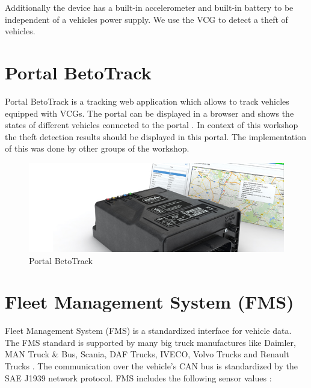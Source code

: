 Additionally the device has a built-in accelerometer and built-in battery to be independent of a vehicles power supply. We use the VCG to detect a theft of vehicles.

\section{Portal BetoTrack}
\label{sec::Portal}

Portal BetoTrack is a tracking web application which allows to track vehicles equipped with VCGs. The portal can be displayed in a browser and shows the states of different vehicles connected to the portal \cite{BetoTrack}.
In context of this workshop the theft detection results should be displayed in this portal. The implementation of this was done by other groups of the workshop.

\begin{figure}[h]
    \includegraphics[width=1.0\textwidth]{src/pic/betotrack_630x220px.jpg}
    \caption{Portal BetoTrack \cite{BetoTrack}} 
\end{figure}

\section{Fleet Management System (FMS)}
\label{sec::FMSDef}

Fleet Management System (FMS) is a standardized interface for vehicle data. The FMS standard is supported by many big truck manufactures like Daimler, MAN Truck \& Bus, Scania, DAF Trucks, IVECO, Volvo Trucks and Renault Trucks \cite{FMS}.
The communication over the vehicle's CAN bus is standardized by the SAE J1939 network protocol.
FMS includes the following sensor values \cite{FMSStd}:

